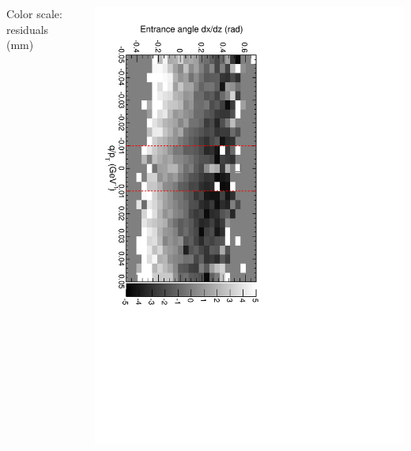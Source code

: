 \documentclass[compress]{beamer}
\begin{document}
\begin{frame}
\begin{columns}
\vspace{-0.25 cm}
\hfill {\scriptsize Color scale: residuals (mm)}

\includegraphics[height=\linewidth, angle=90]{sawtooth_qoverpt_complicated2.pdf}
\end{columns}
\end{frame}
\end{document}
